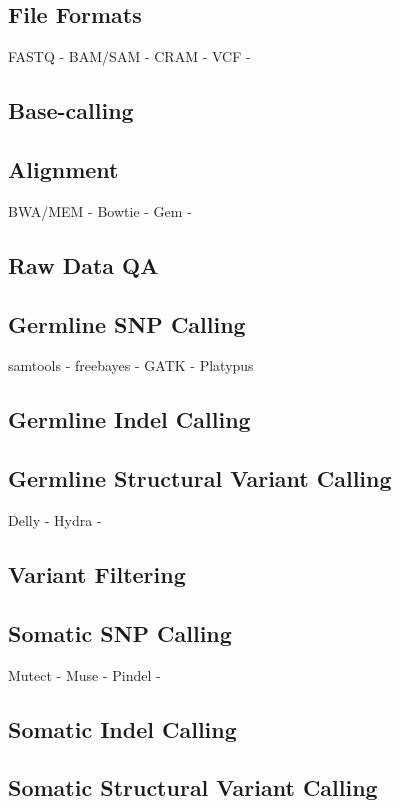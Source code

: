 \subsection{File Formats}
FASTQ - 
BAM/SAM -
CRAM -
VCF - 

\subsection{Base-calling}

\subsection{Alignment}
BWA/MEM -
Bowtie - 
Gem - 

\subsection{Raw Data QA}

\subsection{Germline SNP Calling}
samtools - 
freebayes - 
GATK - 
Platypus


\subsection{Germline Indel Calling}

\subsection{Germline Structural Variant Calling}
Delly - 
Hydra - 


\subsection{Variant Filtering}

\subsection{Somatic SNP Calling}
Mutect - 
Muse - 
Pindel -


\subsection{Somatic Indel Calling}

\subsection{Somatic Structural Variant Calling}

